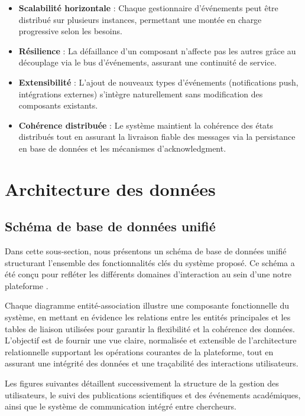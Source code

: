 \documentclass{rapportPfe}
\begin{document}
\begin{itemize}
    \item \textbf{Scalabilité horizontale} : Chaque gestionnaire d'événements peut être distribué sur plusieurs instances, permettant une montée en charge progressive selon les besoins.
    
    \item \textbf{Résilience} : La défaillance d'un composant n'affecte pas les autres grâce au découplage via le bus d'événements, assurant une continuité de service.
    
    \item \textbf{Extensibilité} : L'ajout de nouveaux types d'événements (notifications push, intégrations externes) s'intègre naturellement sans modification des composants existants.
    
    \item \textbf{Cohérence distribuée} : Le système maintient la cohérence des états distribués tout en assurant la livraison fiable des messages via la persistance en base de données et les mécanismes d'acknowledgment.
\end{itemize}

\FloatBarrier

\section{Architecture des données}

\subsection{Schéma de base de données unifié}

Dans cette sous-section, nous présentons un schéma de base de données unifié structurant l’ensemble des fonctionnalités clés du système proposé. Ce schéma a été conçu pour refléter les différents domaines d’interaction au sein d’une notre plateforme .

Chaque diagramme entité-association illustre une composante fonctionnelle du système, en mettant en évidence les relations entre les entités principales et les tables de liaison utilisées pour garantir la flexibilité et la cohérence des données. L’objectif est de fournir une vue claire, normalisée et extensible de l’architecture relationnelle supportant les opérations courantes de la plateforme, tout en assurant une intégrité des données et une traçabilité des interactions utilisateurs.

Les figures suivantes détaillent successivement la structure de la gestion des utilisateurs, le suivi des publications scientifiques et des événements académiques, ainsi que le système de communication intégré entre chercheurs.
\end{document}
